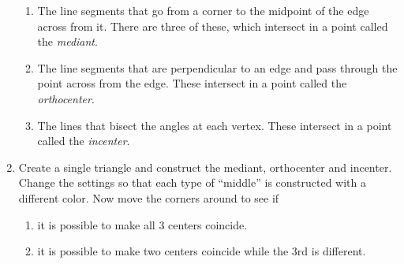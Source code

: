 \begin{enumerate}
\begin{enumerate}
	\item The line segments that go from a corner to the midpoint of the edge across from it.  There are three of these, which intersect in a point called the {\em mediant}.
	\item The line segments that are perpendicular to an edge and pass through the point across from the edge.  These intersect in a point called the {\em orthocenter}.
	\item The lines that bisect the angles at each vertex.  These intersect in a point called the {\em incenter}.
\end{enumerate}

\item Create a single triangle and construct the mediant, orthocenter and incenter.  Change the settings so that each type of ``middle'' is constructed with a different color.  Now move the corners around to see if

\begin{enumerate}
	\item it is possible to make all 3 centers coincide.
	\item it is possible to make two centers coincide while the 3rd is different.
\end{enumerate}

\end{enumerate}
